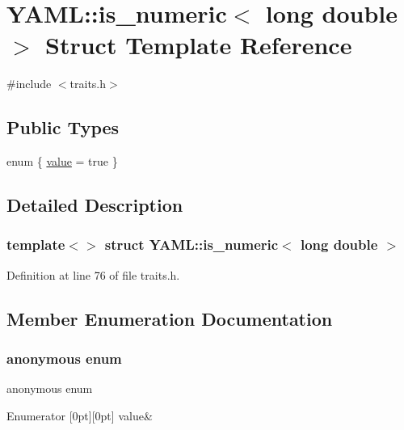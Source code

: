 \hypertarget{struct_y_a_m_l_1_1is__numeric_3_01long_01double_01_4}{}\section{Y\+A\+ML\+::is\+\_\+numeric$<$ long double $>$ Struct Template Reference}
\label{struct_y_a_m_l_1_1is__numeric_3_01long_01double_01_4}


{\ttfamily \#include $<$traits.\+h$>$}

\subsection*{Public Types}
\begin{DoxyCompactItemize}
\item 
enum \{ \mbox{\hyperlink{struct_y_a_m_l_1_1is__numeric_3_01long_01double_01_4_ae6bd5000f50dfca2310d9e596677cee3aa06da466692671be0f0f0bdc7401821e}{value}} = true
 \}
\end{DoxyCompactItemize}


\subsection{Detailed Description}
\subsubsection*{template$<$$>$\newline
struct Y\+A\+M\+L\+::is\+\_\+numeric$<$ long double $>$}



Definition at line 76 of file traits.\+h.



\subsection{Member Enumeration Documentation}
\mbox{\label{struct_y_a_m_l_1_1is__numeric_3_01long_01double_01_4_ae6bd5000f50dfca2310d9e596677cee3}} 
\subsubsection{\texorpdfstring{anonymous enum}{anonymous enum}}
{\footnotesize\ttfamily anonymous enum}

\begin{DoxyEnumFields}{Enumerator}
[0pt][0pt]{}\mbox{\label{struct_y_a_m_l_1_1is__numeric_3_01long_01double_01_4_ae6bd5000f50dfca2310d9e596677cee3aa06da466692671be0f0f0bdc7401821e}} 
value&\\
\hline

\end{DoxyEnumFields}


